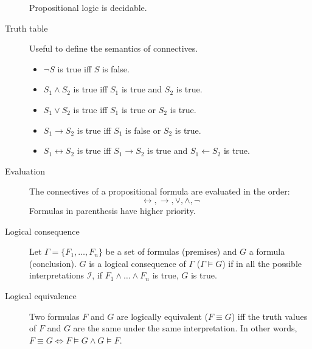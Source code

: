 \begin{description}
        Propositional logic is decidable.

    \item[Truth table] 
        Useful to define the semantics of connectives.
        \begin{itemize}
            \item $\lnot S$ is true iff $S$ is false.
            \item $S_1 \land S_2$ is true iff $S_1$ is true and $S_2$ is true.
            \item $S_1 \vee S_2$ is true iff $S_1$ is true or $S_2$ is true.
            \item $S_1 \rightarrow S_2$ is true iff $S_1$ is false or $S_2$ is true.
            \item $S_1 \leftrightarrow S_2$ is true iff $S_1 \rightarrow S_2$ is true and $S_1 \leftarrow S_2$ is true.
        \end{itemize}


    \item[Evaluation] 
        The connectives of a propositional formula are evaluated in the order:
        \[ \leftrightarrow, \rightarrow, \vee, \land, \lnot \]
        Formulas in parenthesis have higher priority.

   \item[Logical consequence]  
        Let $\Gamma = \{F_1, \dots, F_n\}$ be a set of formulas (premises) and $G$ a formula (conclusion).
        $G$ is a logical consequence of $\Gamma$ ($\Gamma \models G$)
        if in all the possible interpretations $\mathcal{I}$, 
        if $F_1 \land \dots \land F_n$ is true, $G$ is true.

   \item[Logical equivalence] 
       Two formulas $F$ and $G$ are logically equivalent ($F \equiv G$) iff the truth values of $F$ and $G$
       are the same under the same interpretation.
       In other words, $F \equiv G \iff F \models G \land G \models F$.


\end{description}
